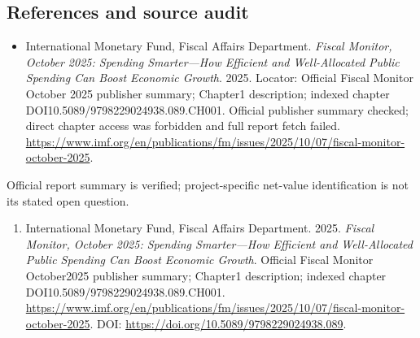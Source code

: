 \documentclass[11pt,a4paper]{article}
\begin{document}
\subsection*{References and source audit}
\begin{itemize}
\item International Monetary Fund, Fiscal Affairs Department. \emph{Fiscal Monitor, October 2025: Spending Smarter—How Efficient and Well-Allocated Public Spending Can Boost Economic Growth}. 2025. Locator: Official Fiscal Monitor October 2025 publisher summary; Chapter1 description; indexed chapter DOI10.5089/9798229024938.089.CH001. Official publisher summary checked; direct chapter access was forbidden and full report fetch failed. \url{https://www.imf.org/en/publications/fm/issues/2025/10/07/fiscal-monitor-october-2025}.
\end{itemize}
Official report summary is verified; project-specific net-value identification is not its stated open question.
\begin{enumerate}\raggedright
\item\hypertarget{definitions:source:30007533:1}{} International Monetary Fund, Fiscal Affairs Department. 2025. \emph{Fiscal Monitor, October 2025: Spending Smarter—How Efficient and Well-Allocated Public Spending Can Boost Economic Growth}. Official Fiscal Monitor October2025 publisher summary; Chapter1 description; indexed chapter DOI10.5089/9798229024938.089.CH001.
\url{https://www.imf.org/en/publications/fm/issues/2025/10/07/fiscal-monitor-october-2025}.
DOI: \url{https://doi.org/10.5089/9798229024938.089}.
\end{enumerate}
\end{document}
